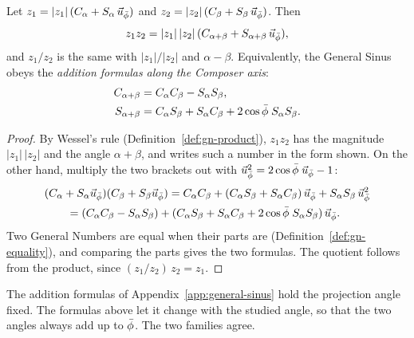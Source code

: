 \begin{theorem}\label{thm:gn-turning}
Let $z_1 = |z_1|\,(C_\alpha + S_\alpha\,\vec{u}_{\bar{\phi}})$ and $z_2 = |z_2|\,(C_\beta + S_\beta\,\vec{u}_{\bar{\phi}})$. Then
\[
z_1 z_2 = |z_1|\,|z_2|\,(C_{\alpha + \beta} + S_{\alpha + \beta}\,\vec{u}_{\bar{\phi}}) ,
\]
and $z_1/z_2$ is the same with $|z_1|/|z_2|$ and $\alpha - \beta$. Equivalently, the General Sinus obeys the \emph{addition formulas along the Composer axis}:
\begin{align*}
C_{\alpha + \beta} &= C_\alpha C_\beta - S_\alpha S_\beta , \\
S_{\alpha + \beta} &= C_\alpha S_\beta + S_\alpha C_\beta + 2\cos\bar{\phi}\;S_\alpha S_\beta .
\end{align*}
\end{theorem}

\begin{proof}
By Wessel's rule (Definition~\ref{def:gn-product}), $z_1z_2$ has the magnitude $|z_1|\,|z_2|$ and the angle $\alpha + \beta$, and  writes such a number in the form shown. On the other hand, multiply the two brackets out with $\vec{u}_{\bar{\phi}}^2 = 2\cos\bar{\phi}\;\vec{u}_{\bar{\phi}} - 1$:
\begin{align*}
&(C_\alpha + S_\alpha\vec{u}_{\bar{\phi}})(C_\beta + S_\beta\vec{u}_{\bar{\phi}}) = C_\alpha C_\beta + (C_\alpha S_\beta + S_\alpha C_\beta)\,\vec{u}_{\bar{\phi}} + S_\alpha S_\beta\,\vec{u}_{\bar{\phi}}^2 \\
&\qquad = (C_\alpha C_\beta - S_\alpha S_\beta) + (C_\alpha S_\beta + S_\alpha C_\beta + 2\cos\bar{\phi}\;S_\alpha S_\beta)\,\vec{u}_{\bar{\phi}} .
\end{align*}
Two General Numbers are equal when their parts are (Definition~\ref{def:gn-equality}), and comparing the parts gives the two formulas. The quotient follows from the product, since $(z_1/z_2)\,z_2 = z_1$.
\end{proof}

The addition formulas of Appendix~\ref{app:general-sinus} hold the projection angle fixed. The formulas above let it change with the studied angle, so that the two angles always add up to $\bar{\phi}$. The two families agree.

